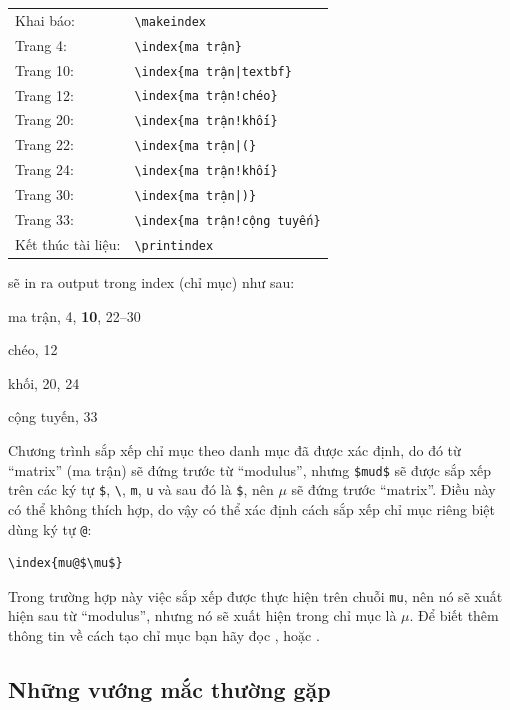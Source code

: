 \documentclass[a4paper]{report}
\begin{document}
\begin{center}
\begin{tabular}{ll}
Khai báo: & \verb|\makeindex|\\ 
Trang 4: & \verb|\index{ma trận}|\\
Trang 10: & \verb"\index{ma trận|textbf}"\\
Trang 12: & \verb|\index{ma trận!chéo}|\\
Trang 20: & \verb|\index{ma trận!khối}|\\
Trang 22: & \verb"\index{ma trận|(}"\\
Trang 24: & \verb|\index{ma trận!khối}|\\
Trang 30: & \verb"\index{ma trận|)}"\\
Trang 33: & \verb|\index{ma trận!cộng tuyến}|\\
Kết thúc tài liệu: & \verb|\printindex|
\end{tabular}
\end{center}
sẽ in ra output trong index (chỉ mục) như sau:
\begin{description}
\item ma trận, 4, \textbf{10}, 22--30
\begin{description}
\item chéo, 12
\item khối, 20, 24
\item cộng tuyến, 33
\end{description}
\end{description}

Chương trình  sắp xếp chỉ mục theo danh mục đã được xác định, do đó từ ``matrix'' (ma trận) sẽ đứng trước từ ``modulus'', nhưng \verb|$mud$| sẽ được sắp xếp trên các ký tự \verb|$|, \verb|\|, \texttt{m}, \texttt{u} và sau đó là \verb|$|, nên $\mu$ sẽ đứng trước ``matrix''. Điều này có thể không thích hợp, do vậy có thể xác định cách sắp xếp  chỉ mục riêng biệt dùng ký tự \verb|@|:

\begin{verbatim}
\index{mu@$\mu$}
\end{verbatim}
Trong trường hợp này việc sắp xếp được thực hiện trên chuỗi \verb|mu|, nên nó sẽ xuất hiện sau từ ``modulus'', nhưng nó sẽ xuất hiện trong  chỉ mục là $\mu$. Để biết thêm thông tin về cách tạo chỉ mục bạn hãy đọc \latexbook{}, \latexcomp{} hoặc \latexguide.


\subsection{Những vướng mắc thường gặp}
\label{sec:idxproblems}
\end{document}
